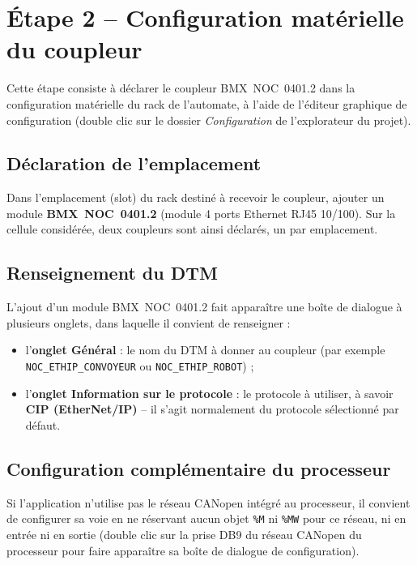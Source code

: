 \section{Étape 2 -- Configuration matérielle du coupleur}
\label{secEtapeConfigMaterielle}

Cette étape consiste à déclarer le coupleur BMX~NOC~0401.2 dans la
configuration matérielle du rack de l'automate, à l'aide de l'éditeur
graphique de configuration (double clic sur le dossier \emph{Configuration}
de l'explorateur du projet).

\subsection{Déclaration de l'emplacement}

Dans l'emplacement (slot) du rack destiné à recevoir le coupleur, ajouter
un module \textbf{BMX~NOC~0401.2} (module 4 ports Ethernet RJ45 10/100).
Sur la cellule considérée, deux coupleurs sont ainsi déclarés, un par
emplacement.

\subsection{Renseignement du DTM}

L'ajout d'un module BMX~NOC~0401.2 fait apparaître une boîte de dialogue à
plusieurs onglets, dans laquelle il convient de renseigner :

\begin{itemize}
    \item l'\textbf{onglet Général} : le nom du DTM à donner au coupleur
    (par exemple \texttt{NOC\_ETHIP\_CONVOYEUR} ou
    \texttt{NOC\_ETHIP\_ROBOT}) ;
    \item l'\textbf{onglet Information sur le protocole} : le protocole à
    utiliser, à savoir \textbf{CIP (EtherNet/IP)} -- il s'agit normalement
    du protocole sélectionné par défaut.
\end{itemize}

\subsection{Configuration complémentaire du processeur}

Si l'application n'utilise pas le réseau CANopen intégré au processeur, il
convient de configurer sa voie en ne réservant aucun objet \texttt{\%M} ni
\texttt{\%MW} pour ce réseau, ni en entrée ni en sortie (double clic sur la
prise DB9 du réseau CANopen du processeur pour faire apparaître sa boîte
de dialogue de configuration).


